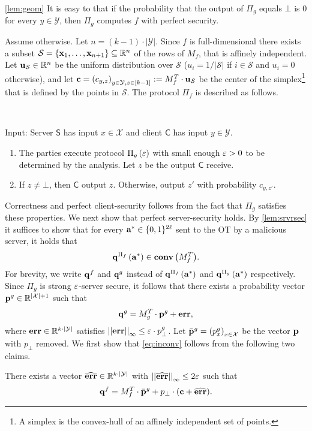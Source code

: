 \documentclass{llncs}
\renewcommand{\S}{\mathcal{S}}
\newcommand{\X}{\mathcal{X}}
\newcommand{\Y}{\mathcal{Y}}
\newcommand{\CH}[1]{\normalfont{\mathbf{conv}\of{#1}}}
\newcommand{\p}{\myvec{p}}
\renewcommand{\q}{\myvec{q}}
\renewcommand{\a}{\myvec{a}}
\renewcommand{\c}{\myvec{c}}
\newcommand{\x}{\myvec{x}}
\newcommand{\errvec}{\myvec{err}}
\newcommand{\norm}[2]{\left|\left|#1\right|\right|_{#2}}
\renewcommand{\Sc}{\mathsf{S}}
\newcommand{\Cc}{\mathsf{C}}
\begin{document}
\begin{proofof}{\cref{lem:geom}}
It is easy to that if the probability that the output of $\Pi_g$ equals $\bot$ is 0 for every $y\in\Y$, then $\Pi_g$ computes $f$ with perfect security.

Assume otherwise. Let $n=(k-1)\cdot|\Y|$. Since $f$ is full-dimensional there exists a subset $\S=\set{\x_1,\ldots,\x_{n+1}}\su\R^{n}$ of the rows of $M_f$, that is affinely independent. Let $\myvec{u}_\S\in\R^{n}$ be the uniform distribution over $\S$ (\ie $u_i=1/|\S|$ if $i\in\S$ and $u_i=0$ otherwise), and let $\c=\vect{c_{y,z}}_{y\in\Y,z\in[k-1]}:=M^T_f\cdot\myvec{u}_{\S}$ be the center of the simplex\footnote{A simplex is the convex-hull of an affinely independent set of points.} that is defined by the points in $\S$. The protocol $\Pi_f$ is described as follows. 

\begin{protocol}[$\Pi_f$]~

Input: Server $\Sc$ has input $x\in\X$ and client $\Cc$ has input $y\in\Y$.

\begin{enumerate}
	\item The parties execute protocol $\Pi_g\left ( \varepsilon \right )$ with small enough $\varepsilon>0$ to be determined by the analysis. Let $z$ be the output $\Cc$ receive.

	\item If $z\ne\bot$, then $\Cc$ output $z$. Otherwise, output $z'$ with probability $c_{y,z'}$.
\end{enumerate}
\end{protocol}

Correctness and perfect client-security follows from the fact that $\Pi_g$ satisfies these properties. We next show that perfect server-security holds. By \cref{lem:srvrsec} it suffices to show that for every $\a^*\in\zo^{2\ell}$ sent to the OT by a malicious server, it holds that
\begin{align}\label{eq:inconv}
\q^{\Pi_f}\of{\a^*}\in\CH{M_f^T}.
\end{align}
For brevity, we write $\q^f$ and $\q^g$ instead of $\q^{\Pi_f}\of{\a^*}$ and $\q^{\Pi_g}\of{\a^*}$ respectively. Since $\Pi_g$ is strong $\varepsilon$-server secure, it follows that there exists a probability vector $\p^g\in\R^{|\X|+1}$ such that
$$\q^{g}=M_g^T\cdot\p^g+\errvec,$$
where $\errvec\in\R^{k\cdot|\Y|}$ satisfies $\norm{\errvec}{\infty}\leq\eps\cdot p^g_\bot$. Let $\bar{\p}^g=\vect{p_x^g}_{x\in\X}$ be the vector $\p$ with $p_\bot$ removed. We first show that \cref{eq:inconv} follows from the following two claims.
\begin{claim}\label{clm:first}
There exists a vector $\widehat{\errvec}\in\R^{k\cdot|\Y|}$ with $\norm{\widehat{\errvec}}{\infty}\leq 2\eps$ such that 
$$\q^f=M_f^T\cdot\bar{\p}^g+p_\bot\cdot(\c+\widehat{\errvec}).$$
\end{claim}


\end{proofof}
\end{document}
